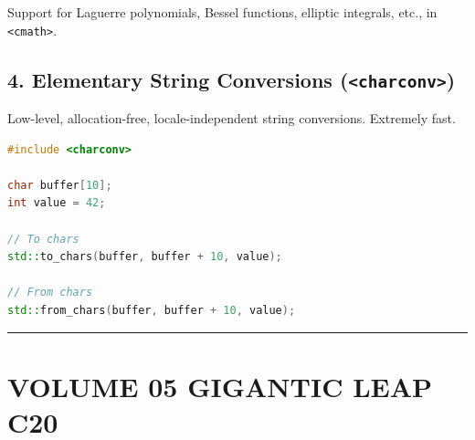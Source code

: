 Support for Laguerre polynomials, Bessel functions, elliptic integrals,
etc., in \passthrough{\lstinline!<cmath>!}.

\hypertarget{elementary-string-conversions-charconv}{%
\section{\texorpdfstring{4. Elementary String Conversions
(\texttt{\textless{}charconv\textgreater{}})}{4. Elementary String Conversions (\textless charconv\textgreater)}}\label{elementary-string-conversions-charconv}}

Low-level, allocation-free, locale-independent string conversions.
Extremely fast.

\begin{lstlisting}[language={C++}]
#include <charconv>

char buffer[10];
int value = 42;

// To chars
std::to_chars(buffer, buffer + 10, value);

// From chars
std::from_chars(buffer, buffer + 10, value);
\end{lstlisting}

\begin{center}\rule{0.5\linewidth}{0.5pt}\end{center}

\hypertarget{volume-05-gigantic-leap-c20}{%
\chapter{VOLUME 05 GIGANTIC LEAP
C20}\label{volume-05-gigantic-leap-c20}}
